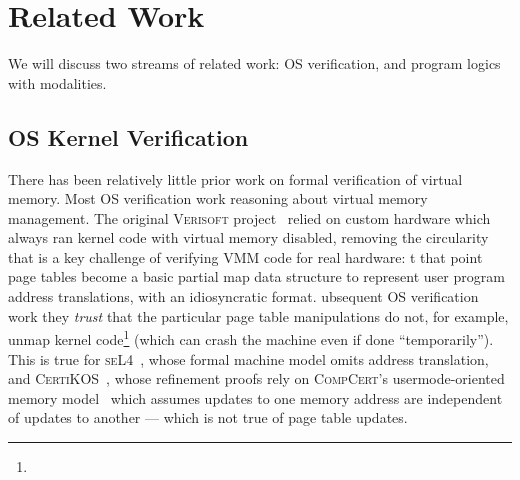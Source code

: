 \section{Related Work}
\label{sec:relwork}

We will discuss two streams of related work: OS verification, and 
program logics with modalities.

\subsection{OS Kernel Verification}
There has been relatively little prior work on formal verification of virtual memory.
Most OS verification work  reasoning about virtual memory management.
The original \textsc{Verisoft} project~\cite{alkassar2008verisoft,alkassar2010pervasive,alkassar2008formal,dalinger2005verification,hillebrand2005address,alkassar2008formal,starostin2010formal} 
relied on custom hardware\del{,} which always ran kernel code with virtual memory disabled, removing the circularity that is a key challenge of verifying
VMM code for real hardware: t that point page tables become a basic partial map data structure to represent user program address translations,
with an idiosyncratic format. ubsequent OS verification work
 
 they \emph{trust}
that the particular page table manipulations do not, for example, unmap kernel code\footnote{}
 (which can crash the machine even if done ``temporarily'').
This is true for \textsc{seL4}~\cite{Klein2009seL4,seL4TOCS,Sewell2013translation}, whose formal machine model omits address translation,
and \textsc{CertiKOS}~\cite{gu15,gu2016certikos,gu2018certikos,chen2016interrupts}, whose refinement proofs rely on
\textsc{CompCert}'s usermode-oriented memory model~\cite{leroy2008formal,leroy2009formally} which assumes
updates to one memory address are independent of updates to another ---
which is not true of page table updates.
